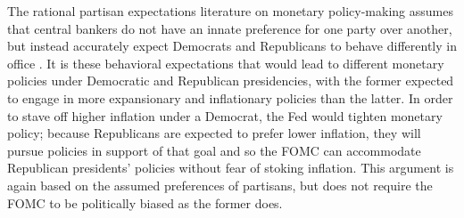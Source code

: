 \documentclass[a4paper]{article}
\begin{document}
The rational partisan expectations literature on monetary policy-making assumes that central bankers do not have an innate preference for one party over another, but instead accurately expect Democrats and Republicans to behave differently in office \citep{Alesina1991,Hibbs1994}. It is these behavioral expectations that would lead to different monetary policies under Democratic and Republican presidencies, with the former expected to engage in more expansionary and inflationary policies than the latter. In order to stave off higher inflation under a Democrat, the Fed would tighten monetary policy; because Republicans are expected to prefer lower inflation, they will pursue policies in support of that goal and so the FOMC can accommodate Republican presidents' policies without fear of stoking inflation. This argument is again based on the assumed preferences of partisans, but does not require the FOMC to be politically biased as the former does. 
\end{document}
